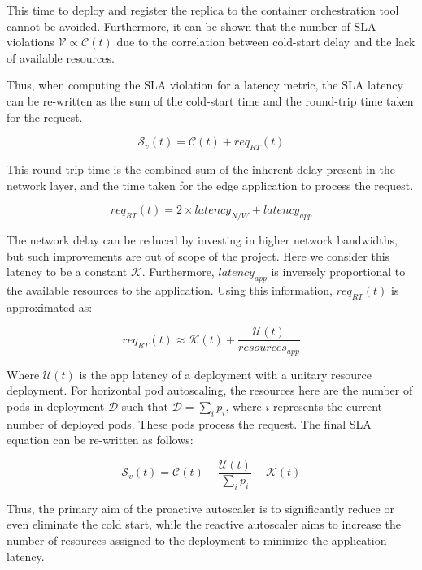 This time to deploy and register the replica to the container orchestration tool cannot be avoided. Furthermore, it can be shown that the number of SLA violations $\mathcal{V} \propto \mathcal{C}(t)$ due to the correlation between cold-start delay and the lack of available resources.\par

Thus, when computing the SLA violation for a latency metric, the SLA latency can be re-written as the sum of the cold-start time and the round-trip time taken for the request.

\begin{equation}
    \mathcal{S}_{v}(t) = \mathcal{C}(t) + req_{RT}(t)
\end{equation}


This round-trip time is the combined sum of the inherent delay present in the network layer, and the time taken for the edge application to process the request.

\begin{equation}
    req_{RT}(t) = 2 \times latency_{N/W} + latency_{app}
\end{equation}

The network delay can be reduced by investing in higher network bandwidths, but such improvements are out of scope of the project. Here we consider this latency to be a constant $\mathcal{K}$. Furthermore, $latency_{app}$ is inversely proportional to the available resources to the application. Using this information, $req_{RT}(t)$ is approximated as:

\begin{equation}
    req_{RT}(t) \approx \mathcal{K}(t) + \frac{\mathcal{U}(t)}{resources_{app}}
\end{equation}

Where $\mathcal{U}(t)$ is the app latency of a deployment with a unitary resource deployment. For horizontal pod autoscaling, the resources here are the number of pods in deployment $\mathcal{D}$ such that $\mathcal{D} = \sum_{i} p_{i}$, where $i$ represents the current number of deployed pods. These pods process the request. The final SLA equation can be re-written as follows:

\begin{equation}
    \mathcal{S}_{v}(t) = \mathcal{C}(t) + \frac{\mathcal{U}(t)}{\sum_{i} p_{i}} + \mathcal{K}(t)
\end{equation}

Thus, the primary aim of the proactive autoscaler is to significantly reduce or even eliminate the cold start, while the reactive autoscaler aims to increase the number of resources assigned to the deployment to minimize the application latency.\par

